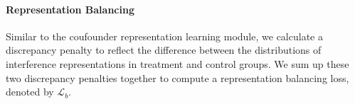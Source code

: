 \paragraph{Representation Balancing}
Similar to the coufounder representation learning module, we %
calculate a discrepancy penalty to reflect the difference between the distributions of interference representations in treatment and control groups. We sum up these two discrepancy penalties together to compute a representation balancing loss, denoted by $\mathcal{L}_b$.




